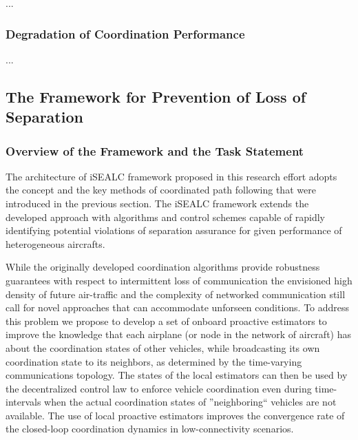 \documentclass[letter,onecolumn,12pt]{aiaa-tc}
\newcommand{\1}{1_n}
\begin{document}
...

\subsubsection{Degradation of Coordination Performance}

...


\subsection{The Framework for Prevention of Loss of Separation }
\label{subsec:framework}

\subsubsection{Overview of the Framework and the Task Statement}
The architecture of iSEALC framework proposed in this research effort adopts the concept and the key methods of coordinated path following that were introduced in the previous section. The iSEALC framework extends the developed  approach with algorithms and control schemes capable of rapidly identifying potential violations of separation assurance for given performance of heterogeneous aircrafts.

While the originally developed coordination algorithms provide robustness guarantees with respect to intermittent loss of communication the envisioned high density of future air-traffic and the complexity of networked communication still call for novel approaches that can accommodate unforseen conditions. To address this problem we propose to develop a set of onboard proactive estimators to improve the knowledge that each airplane (or node in the network of aircraft) has about the coordination states of other vehicles, while  broadcasting its own coordination state to its neighbors, as determined by the time-varying communications topology. The states of the local estimators can then be used by the decentralized control law to enforce vehicle coordination even during time-intervals when the actual coordination states of ''neighboring`` vehicles are not available. The use of local proactive estimators improves the convergence rate of the closed-loop coordination dynamics in low-connectivity scenarios.
\end{document}
